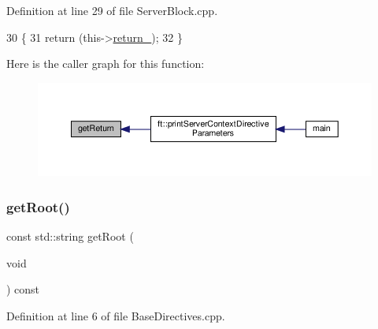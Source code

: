 Definition at line 29 of file Server\+Block.\+cpp.


\begin{DoxyCode}
30     \{
31         \textcolor{keywordflow}{return} (this->\hyperlink{classft_1_1_server_block_abab721f365aff66f8a1289de21c8f01f}{return\_});
32     \}
\end{DoxyCode}
Here is the caller graph for this function\+:
\nopagebreak
\begin{figure}[H]
\begin{center}
\leavevmode
\includegraphics[width=350pt]{classft_1_1_server_block_aeef5e4710c02406c46e54d4aa0c8f57c_icgraph}
\end{center}
\end{figure}
\mbox{\label{classft_1_1_base_directives_aa5dbcb08bda0a0e7e502d2df7cf64287}} 
\subsubsection{\texorpdfstring{get\+Root()}{getRoot()}}
{\footnotesize\ttfamily const std\+::string get\+Root (\begin{DoxyParamCaption}\item[{void}]{ }\end{DoxyParamCaption}) const\hspace{0.3cm}{\ttfamily [inherited]}}



Definition at line 6 of file Base\+Directives.\+cpp.


